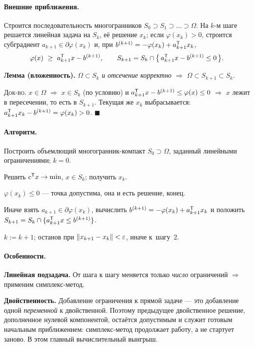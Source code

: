 \paragraph{Внешние приближения.}
Строится последовательность многогранников
$S_0 \supset S_1 \supset \dots \supset \Omega$. На $k$-м шаге решается
линейная задача на $S_k$, её решение $x_k$; если $\varphi(x_k) > 0$, строится
субградиент $a_{k+1} \in \partial\varphi(x_k)$ и, при
$b^{(k+1)} = -\varphi(x_k) + a_{k+1}^{\mathsf{T}} x_k$,
\[
  \varphi(x) \ \ge\ a_{k+1}^{\mathsf{T}} x - b^{(k+1)} ,
  \qquad
  S_{k+1} = S_k \cap \big\{\, a_{k+1}^{\mathsf{T}} x - b^{(k+1)} \le 0 \,\big\} .
\]

\textbf{Лемма (вложенность).} \textit{$\Omega \subset S_k$ и отсечение
корректно $\Rightarrow$ $\Omega \subset S_{k+1} \subset S_k$.}

\textsc{Док-во.} $x \in \Omega$ $\Rightarrow$ $x \in S_k$ (по условию) и
$a_{k+1}^{\mathsf{T}} x - b^{(k+1)} \le \varphi(x) \le 0$ $\Rightarrow$ $x$ лежит в
пересечении, то есть в $S_{k+1}$. Текущая же $x_k$ выбрасывается:
$a_{k+1}^{\mathsf{T}} x_k - b^{(k+1)} = \varphi(x_k) > 0$. $\blacksquare$

\paragraph{Алгоритм.}
\begin{csteps}
  \item Построить объемлющий многогранник-компакт $S_0 \supset \Omega$,
        заданный линейными ограничениями; $k = 0$.
  \item Решить $c^{\mathsf{T}} x \to \min$, $x \in S_k$; получить $x_k$.
  \item $\varphi(x_k) \le 0$ — точка допустима, она и есть решение, конец.
  \item Иначе взять $a_{k+1} \in \partial\varphi(x_k)$, вычислить
        $b^{(k+1)} = -\varphi(x_k) + a_{k+1}^{\mathsf{T}} x_k$ и положить
        $S_{k+1} = S_k \cap \{a_{k+1}^{\mathsf{T}} x \le b^{(k+1)}\}$.
  \item $k := k+1$; останов при $\left\lVert x_{k+1} - x_k \right\rVert < \varepsilon$, иначе
        к~шагу~2.
\end{csteps}

\paragraph{Особенности.}
\textbf{Линейная подзадача.} От шага к шагу меняется только \emph{число}
ограничений $\Rightarrow$ применим симплекс-метод.

\textbf{Двойственность.} Добавление ограничения к прямой задаче — это
добавление одной \emph{переменной} к двойственной. Поэтому предыдущее
двойственное решение, дополненное нулевой компонентой, остаётся допустимым и
служит готовым начальным приближением: симплекс-метод продолжает работу, а не
стартует заново. В этом главный вычислительный выигрыш.

